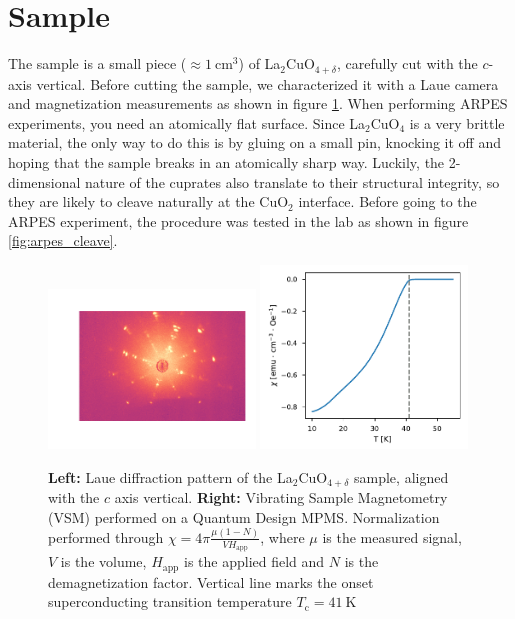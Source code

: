 \section{Sample}
The sample is a small piece ($\approx \SI{1}{\centi\meter\cubed}$) of La$_2$CuO$_{4+\delta}$, carefully cut with the $c$-axis vertical. Before cutting the sample, we characterized it with a Laue camera and magnetization measurements as shown in figure \ref{fig:arpes_vsm}. When performing ARPES experiments, you need an atomically flat surface. Since La$_2$CuO$_4$ is a very brittle material, the only way to do this is by gluing on a small pin, knocking it off and hoping that the sample breaks in an atomically sharp way. Luckily, the 2-dimensional nature of the cuprates also translate to their structural integrity, so they are likely to cleave naturally at the CuO$_2$ interface. Before going to the ARPES experiment, the procedure was tested in the lab as shown in figure \ref{fig:arpes_cleave}.

\begin{figure}
    \centering
    \includegraphics[width=0.49\textwidth]{fig/arpes/laue2.png}
    \includegraphics[width=0.49\textwidth]{fig/arpes/vsm_lcoo.pdf}
    \caption{\textbf{Left:} Laue diffraction pattern of the La$_2$CuO$_{4+\delta}$ sample, aligned with the $c$ axis vertical. \textbf{Right:} Vibrating Sample Magnetometry (VSM) performed on a Quantum Design MPMS. Normalization performed through $\chi=4\pi \frac{\mu(1-N)}{VH_\text{app}}$, where $\mu$ is the measured signal, $V$ is the volume, $H_\text{app}$ is the applied field and $N$ is the demagnetization factor. Vertical line marks the onset superconducting transition temperature $T_\text{c} = \SI{41}{\kelvin}$}
    \label{fig:arpes_vsm}
\end{figure}

